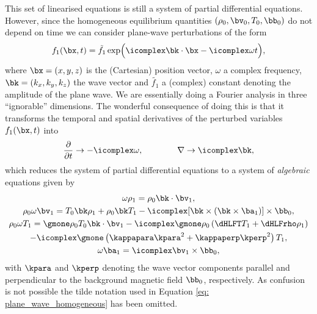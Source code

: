 This set of linearised equations is still a system of partial differential equations. However, since the homogeneous equilibrium quantities $(\rho_0, \bv_0, T_0, \bb_0)$ do not depend on time we can consider plane-wave perturbations of the form
\begin{equation} \label{eq: plane_wave_homogeneous}
  f_1(\bx, t) = \tilde{f_1}\exp\Bigl(\icomplex\bk \cdot \bx - \icomplex\omega t\Bigr),
\end{equation}
where $\bx = (x, y, z)$ is the (Cartesian) position vector, $\omega$ a complex frequency, $\bk = (k_x, k_y, k_z)$ the wave vector and $\tilde{f_1}$ a (complex) constant denoting the amplitude of the plane wave. We are essentially doing a Fourier analysis in three ``ignorable'' dimensions. The wonderful consequence of doing this is that it transforms the temporal and spatial derivatives of the perturbed variables $f_1(\bx, t)$ into
\begin{equation}
  \frac{\partial}{\partial t} \rightarrow -\icomplex\omega, \qquad\qquad
  \nabla \rightarrow \icomplex\bk,
\end{equation}
which reduces the system of partial differential equations to a system of \emph{algebraic} equations given by
\begin{gather}
  \omega \rho_1 = \rho_0 \bk \cdot \bv_1, \label{eq: homo_continuity_algebraic}\\
  \rho_0\omega \bv_1 = T_0 \bk \rho_1 + \rho_0\bk T_1 - \icomplex[\bk \times (\bk \times \ba_1)]\times\bb_0, \\
  \rho_0\omega T_1 =
    \gmone \rho_0T_0 \bk \cdot \bv_1
    - \icomplex\gmone\rho_0\left(\dHLFT T_1 + \dHLFrho \rho_1\right) \nonumber \\
    - \icomplex\gmone \left(\kappapara \kpara^2 + \kappaperp\kperp^2\right)T_1, \\
  \omega \ba_1 = \icomplex\bv_1 \times \bb_0, \label{eq: homo_induction_algebraic}
\end{gather}
with $\kpara$ and $\kperp$ denoting the wave vector components parallel and perpendicular to the background magnetic field $\bb_0$, respectively. As confusion is not possible the tilde notation used in Equation \eqref{eq: plane_wave_homogeneous} has been omitted.

